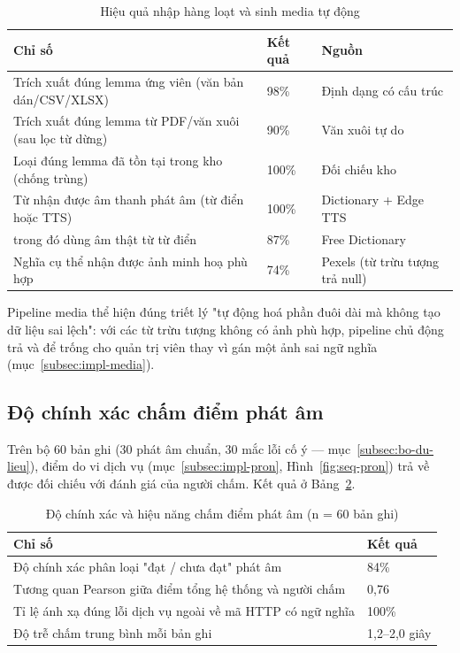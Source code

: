 \begin{table}[h]
  \centering
  \small
  \renewcommand{\arraystretch}{1.3}
  \begin{tabular}{|p{8.6cm}|p{2.6cm}|p{2.4cm}|}
    \hline
    \textbf{Chỉ số} & \textbf{Kết quả} & \textbf{Nguồn} \\
    \hline
    Trích xuất đúng lemma ứng viên (văn bản dán/CSV/XLSX) & 98\% & Định dạng có cấu trúc \\
    \hline
    Trích xuất đúng lemma từ PDF/văn xuôi (sau lọc từ dừng) & 90\% & Văn xuôi tự do \\
    \hline
    Loại đúng lemma đã tồn tại trong kho (chống trùng) & 100\% & Đối chiếu kho \\
    \hline
    Từ nhận được âm thanh phát âm (từ điển hoặc TTS) & 100\% & Dictionary + Edge TTS \\
    \hline
    \quad trong đó dùng âm thật từ từ điển & 87\% & Free Dictionary \\
    \hline
    Nghĩa cụ thể nhận được ảnh minh hoạ phù hợp & 74\% & Pexels (từ trừu tượng trả null) \\
    \hline
  \end{tabular}
  \caption{Hiệu quả nhập hàng loạt và sinh media tự động}
  \label{tab:eval-media}
\end{table}

Pipeline media thể hiện đúng triết lý "tự động hoá phần đuôi dài mà không tạo
dữ liệu sai lệch": với các từ trừu tượng không có ảnh phù hợp, pipeline chủ
động trả  và để trống cho quản trị viên thay vì gán một ảnh sai
ngữ nghĩa (mục~\ref{subsec:impl-media}).

\subsection{Độ chính xác chấm điểm phát âm}
\label{subsec:eval-pron}

Trên bộ 60 bản ghi (30 phát âm chuẩn, 30 mắc lỗi cố ý --- mục~\ref{subsec:bo-du-lieu}),
điểm do vi dịch vụ (mục~\ref{subsec:impl-pron}, Hình~\ref{fig:seq-pron}) trả
về được đối chiếu với đánh giá của người chấm. Kết quả ở
Bảng~\ref{tab:eval-pron}.

\begin{table}[h]
  \centering
  \small
  \renewcommand{\arraystretch}{1.3}
  \begin{tabular}{|p{8.4cm}|p{5.6cm}|}
    \hline
    \textbf{Chỉ số} & \textbf{Kết quả} \\
    \hline
    Độ chính xác phân loại "đạt / chưa đạt" phát âm & 84\% \\
    \hline
    Tương quan Pearson giữa điểm tổng hệ thống và người chấm & 0,76 \\
    \hline
    Tỉ lệ ánh xạ đúng lỗi dịch vụ ngoài về mã HTTP có ngữ nghĩa & 100\% \\
    \hline
    Độ trễ chấm trung bình mỗi bản ghi & 1,2--2,0 giây \\
    \hline
  \end{tabular}
  \caption{Độ chính xác và hiệu năng chấm điểm phát âm (n = 60 bản ghi)}
  \label{tab:eval-pron}
\end{table}

